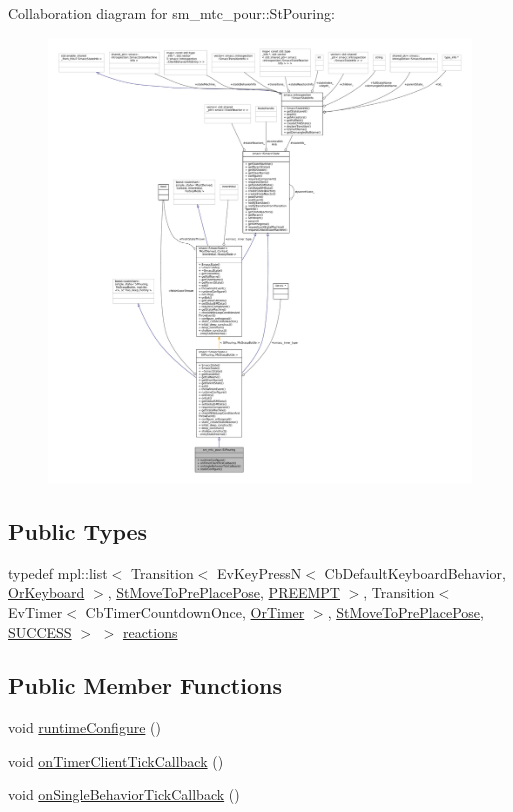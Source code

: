 Collaboration diagram for sm\+\_\+mtc\+\_\+pour\+:\+:St\+Pouring\+:
\nopagebreak
\begin{figure}[H]
\begin{center}
\leavevmode
\includegraphics[width=350pt]{structsm__mtc__pour_1_1StPouring__coll__graph}
\end{center}
\end{figure}
\subsection*{Public Types}
\begin{DoxyCompactItemize}
\item 
typedef mpl\+::list$<$ Transition$<$ Ev\+Key\+PressN$<$ Cb\+Default\+Keyboard\+Behavior, \hyperlink{classsm__mtc__pour_1_1OrKeyboard}{Or\+Keyboard} $>$, \hyperlink{structsm__mtc__pour_1_1StMoveToPrePlacePose}{St\+Move\+To\+Pre\+Place\+Pose}, \hyperlink{classPREEMPT}{P\+R\+E\+E\+M\+PT} $>$, Transition$<$ Ev\+Timer$<$ Cb\+Timer\+Countdown\+Once, \hyperlink{classsm__mtc__pour_1_1OrTimer}{Or\+Timer} $>$, \hyperlink{structsm__mtc__pour_1_1StMoveToPrePlacePose}{St\+Move\+To\+Pre\+Place\+Pose}, \hyperlink{classSUCCESS}{S\+U\+C\+C\+E\+SS} $>$ $>$ \hyperlink{structsm__mtc__pour_1_1StPouring_ad1524f087d6747bfe4bd7dbf9ca42e78}{reactions}
\end{DoxyCompactItemize}
\subsection*{Public Member Functions}
\begin{DoxyCompactItemize}
\item 
void \hyperlink{structsm__mtc__pour_1_1StPouring_abf426d4b8d71a811deadb414afcff865}{runtime\+Configure} ()
\item 
void \hyperlink{structsm__mtc__pour_1_1StPouring_a1ce0ac915a0ef7b5257c0e8bf9408da6}{on\+Timer\+Client\+Tick\+Callback} ()
\item 
void \hyperlink{structsm__mtc__pour_1_1StPouring_a3959d5ef397ca81160193e442ca12d26}{on\+Single\+Behavior\+Tick\+Callback} ()
\end{DoxyCompactItemize}
